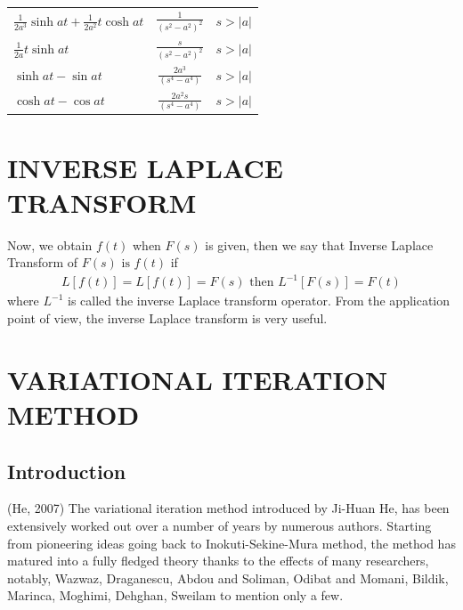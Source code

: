 \documentclass[12pt]{report}
\begin{document}
\begin{center}
\begin{tabular}{llcccc}
		\multicolumn{2}{l}{$\displaystyle \frac{1}{2a^3} \sinh at + \frac{1}{2a^2} t \cosh at$} & \multicolumn{2}{c}{$\displaystyle \frac{1}{(s^2 - a^2)^2 }$} & \multicolumn{2}{c}{$s > |a|$} \\

		\multicolumn{2}{l}{$\displaystyle \frac{1}{2a}t \sinh at$} & \multicolumn{2}{c}{$\displaystyle \frac{s}{(s^2 - a^2)^2 }$} & \multicolumn{2}{c}{$s > |a|$} \\


		\multicolumn{2}{l}{$\displaystyle \sinh at - \sin at $} & \multicolumn{2}{c}{$\displaystyle \frac{2a^3}{(s^4 - a^4) }$} & \multicolumn{2}{c}{$s > |a|$} \\


\multicolumn{2}{l}{$\displaystyle \cosh at - \cos at $} & \multicolumn{2}{c}{$\displaystyle \frac{2a^{2}s}{(s^4 - a^4) }$} & \multicolumn{2}{c}{$s > |a|$} \\



	\end{tabular}
	
\end{center}
\section{INVERSE LAPLACE TRANSFORM}
\qquad Now, we obtain $f(t)$ when $F(s)$ is given, then we say that Inverse Laplace Transform of $F(s) \mbox{ is } f(t)$ if
\begin{align*}
L[f(t)]=L[f(t)]=F(s) \mbox{ then } L^{-1}[F(s)]=F(t)
\end{align*}
where $L^{-1}$ is called the inverse Laplace transform operator. From the application point of view, the inverse Laplace transform is very useful.


\section{VARIATIONAL ITERATION METHOD}
\subsection{Introduction}
(He, 2007) The variational iteration method introduced by Ji-Huan He, has been extensively worked out over a number of years by numerous authors. Starting from pioneering ideas going back to Inokuti-Sekine-Mura method, the method has matured into a fully fledged theory thanks to the effects of many researchers, notably, Wazwaz, Draganescu, Abdou and Soliman, Odibat and Momani, Bildik, Marinca, Moghimi, Dehghan, Sweilam to mention only a few.\\
\end{document}
